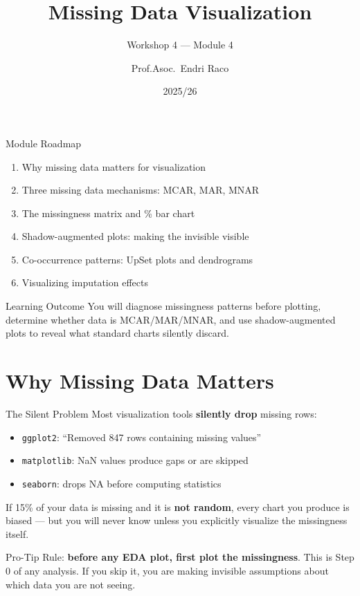 \documentclass[10pt]{beamer}
\title{Missing Data Visualization}
\subtitle{Workshop 4 --- Module 4}
\author{Prof.Asoc.\ Endri Raco}
\institute{Data Visualization for Data Scientists \\ UNYT Tirana}
\date{2025/26}
\begin{document}
\begin{frame}
  \titlepage
\end{frame}

\begin{frame}{Module Roadmap}
  \begin{enumerate}
    \item Why missing data matters for visualization
    \item Three missing data mechanisms: MCAR, MAR, MNAR
    \item The missingness matrix and \% bar chart
    \item Shadow-augmented plots: making the invisible visible
    \item Co-occurrence patterns: UpSet plots and dendrograms
    \item Visualizing imputation effects
  \end{enumerate}
  \begin{exampleblock}{Learning Outcome}
    You will diagnose missingness patterns before plotting, determine
    whether data is MCAR/MAR/MNAR, and use shadow-augmented plots
    to reveal what standard charts silently discard.
  \end{exampleblock}
\end{frame}

\section{Why Missing Data Matters}

\begin{frame}{The Silent Problem}
  Most visualization tools \textbf{silently drop} missing rows:
  \begin{itemize}
    \item \texttt{ggplot2}: ``Removed 847 rows containing missing values''
    \item \texttt{matplotlib}: NaN values produce gaps or are skipped
    \item \texttt{seaborn}: drops NA before computing statistics
  \end{itemize}
  \vspace{6pt}
  If 15\% of your data is missing and it is \textbf{not random}, every
  chart you produce is biased --- but you will never know unless you
  explicitly visualize the missingness itself.
  \begin{alertblock}{Pro-Tip}
    Rule: \textbf{before any EDA plot, first plot the missingness}.
    This is Step 0 of any analysis. If you skip it, you are making
    invisible assumptions about which data you are not seeing.
  \end{alertblock}
\end{frame}
\end{document}

